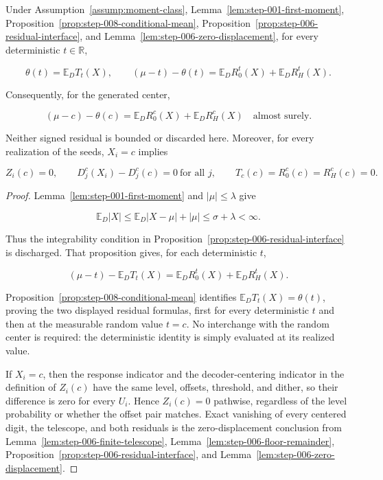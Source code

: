 \begin{proposition}\label{prop:step-008-target-interface}
Under Assumption~\ref{assump:moment-class},
Lemma~\ref{lem:step-001-first-moment},
Proposition~\ref{prop:step-008-conditional-mean},
Proposition~\ref{prop:step-006-residual-interface}, and
Lemma~\ref{lem:step-006-zero-displacement}, for every deterministic
\(t\in\mathbb R\),

\[
\theta(t)=\mathbb E_DT_t(X),
\qquad
(\mu-t)-\theta(t)
=\mathbb E_D R_0^t(X)+\mathbb E_D R_H^t(X).
\]

Consequently, for the generated center,

\[
\boxed{
(\mu-c)-\theta(c)
=\mathbb E_D R_0^c(X)+\mathbb E_D R_H^c(X)
}
\quad\text{almost surely}.
\]

Neither signed residual is bounded or discarded here. Moreover, for every realization of the seeds, \(X_i=c\) implies

\[
Z_i(c)=0,
\qquad
D_j^c(X_i)-D_j^c(c)=0\ \text{for all }j,
\qquad
T_c(c)=R_0^c(c)=R_H^c(c)=0.
\]
\end{proposition}

\begin{proof}
Lemma~\ref{lem:step-001-first-moment} and \(|\mu|\leq\lambda\) give

\[
\mathbb E_D|X|
\leq\mathbb E_D|X-\mu|+|\mu|
\leq\sigma+\lambda<\infty.
\]

Thus the integrability condition in Proposition~\ref{prop:step-006-residual-interface} is discharged. That proposition gives, for each deterministic \(t\),

\[
(\mu-t)-\mathbb E_DT_t(X)
=\mathbb E_D R_0^t(X)+\mathbb E_D R_H^t(X).
\]

Proposition~\ref{prop:step-008-conditional-mean} identifies \(\mathbb E_DT_t(X)=\theta(t)\), proving the two displayed residual formulas, first for every deterministic \(t\) and then at the measurable random value \(t=c\). No interchange with the random center is required: the deterministic identity is simply evaluated at its realized value.

If \(X_i=c\), then the response indicator and the decoder-centering indicator in the definition of \(Z_i(c)\) have the same level, offsets, threshold, and dither, so their difference is zero for every \(U_i\). Hence \(Z_i(c)=0\) pathwise, regardless of the level probability or whether the offset pair matches. Exact vanishing of every centered digit, the telescope, and both residuals is the zero-displacement conclusion from Lemma~\ref{lem:step-006-finite-telescope}, Lemma~\ref{lem:step-006-floor-remainder}, Proposition~\ref{prop:step-006-residual-interface}, and Lemma~\ref{lem:step-006-zero-displacement}.
\end{proof}

